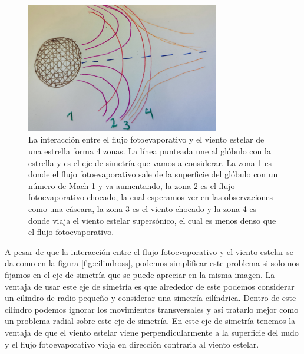 \documentclass{book}
\begin{document}
\begin{figure}[h]
    \centering    \includegraphics[width=0.75\textwidth]{images Chapter 2/Chp2_Zone.jpg}
    \caption{La interacción entre el flujo fotoevaporativo y el viento estelar de una estrella forma 4 zonas. La línea punteada une al glóbulo con la estrella y es el eje de simetría que vamos a considerar. La zona 1 es donde el flujo fotoevaporativo sale de la superficie del glóbulo con un número de Mach 1 y va aumentando, la zona 2 es el flujo fotoevaporativo chocado, la cual esperamos ver en las observaciones como una cáscara, la zona 3 es el viento chocado y la zona 4 es donde viaja el viento estelar supersónico, el cual es menos denso que el flujo fotoevaporativo.}
    \label{fig:zones}
\end{figure}

A pesar de que la interacción entre el flujo fotoevaporativo y el viento estelar se da como en la figura \ref{fig:cilindross}, podemos simplificar este problema si solo nos fijamos en el eje de simetría que se puede apreciar en la misma imagen. La ventaja de usar este eje de simetría es que alrededor de este podemos considerar un cilindro de radio pequeño y considerar una simetría cilíndrica. Dentro de este cilindro podemos ignorar los movimientos transversales y así tratarlo mejor como un problema radial sobre este eje de simetría. En este eje de simetría tenemos la ventaja de que el viento estelar viene perpendicularmente a la superficie del nudo y el flujo fotoevaporativo viaja en dirección contraria al viento estelar. 
\end{document}
